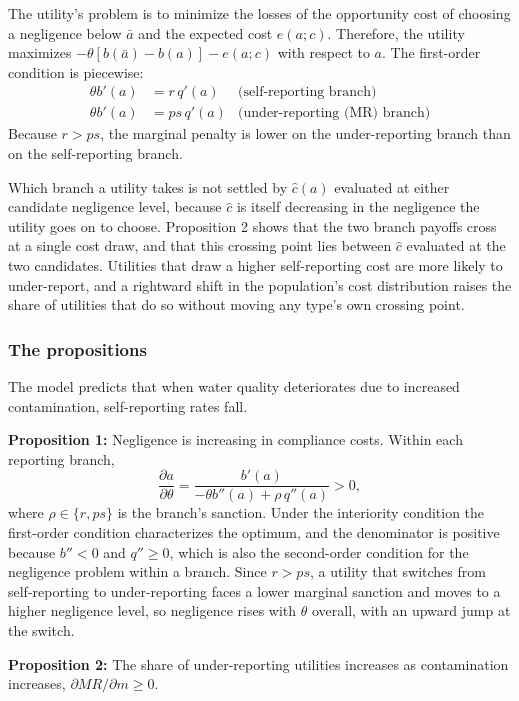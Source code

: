 \documentclass[12pt]{article}
\begin{document}
	The utility's problem is to minimize the losses of the opportunity cost of choosing a negligence below $\bar{a}$ and the expected cost $e(a;c)$. Therefore, the utility maximizes $-\theta[b(\bar{a}) - b(a)] - e(a;c)$ with respect to $a$.
    The first-order condition is piecewise:
	\begin{align}
		\theta b'(a) &= r\, q'(a) & \text{(self-reporting branch)} \\
		\theta b'(a) &= ps\, q'(a) & \text{(under-reporting (MR) branch)}
	\end{align}
	Because $r > ps$, the marginal penalty is lower on the under-reporting branch than on the self-reporting branch.
    
    Which branch a utility takes is not settled by $\hat{c}(a)$ evaluated at either candidate negligence level, because $\hat{c}$ is itself decreasing in the negligence the utility goes on to choose. Proposition 2 shows that the two branch payoffs cross at a single cost draw, and that this crossing point lies between $\hat{c}$ evaluated at the two candidates. Utilities that draw a higher self-reporting cost are more likely to under-report, and a rightward shift in the population's cost distribution raises the share of utilities that do so without moving any type's own crossing point.
	
	\subsubsection{The propositions}
	
	The model predicts that when water quality deteriorates due to increased contamination, self-reporting rates fall.
	
	\textbf{Proposition 1:} Negligence is increasing in compliance costs. Within each reporting branch,
    \[\frac{\partial a}{\partial\theta} = \frac{b'(a)}{-\theta b''(a) + \rho\, q''(a)} > 0,\]
    where $\rho \in \{r, ps\}$ is the branch's sanction. Under the interiority condition the first-order condition characterizes the optimum, and the denominator is positive because $b'' < 0$ and $q'' \ge 0$, which is also the second-order condition for the negligence problem within a branch. Since $r > ps$, a utility that switches from self-reporting to under-reporting faces a lower marginal sanction and moves to a higher negligence level, so negligence rises with $\theta$ overall, with an upward jump at the switch.
	
	\textbf{Proposition 2:} The share of under-reporting utilities increases as contamination increases, $\partial MR/\partial m \ge 0$.
\end{document}
